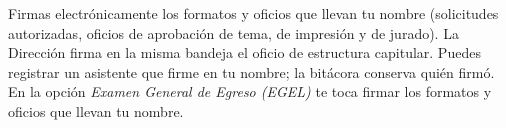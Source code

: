 \documentclass[11pt,a4paper]{article}
\begin{document}
{\small\tableofcontents}
\newpage
\begin{quevasahacer}
Firmas electrónicamente los formatos y oficios que llevan tu nombre (solicitudes autorizadas, oficios de aprobación de tema, de impresión y de jurado). La Dirección firma en la misma bandeja el oficio de estructura capitular. Puedes registrar un asistente que firme en tu nombre; la bitácora conserva quién firmó. En la opción \emph{Examen General de Egreso (EGEL)} te toca firmar los formatos y oficios que llevan tu nombre.
\end{quevasahacer}



\end{document}
